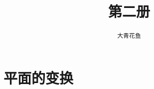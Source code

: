 \documentclass[12pt,UTF8]{ctexbook}
\title{\zihao{0} \bfseries 第二册}
\author{\zihao{2} \texttt{大青花鱼}}
\date{}
\begin{document}
\maketitle
\tableofcontents
\newpage

\chapter{平面的变换}








\end{document}
